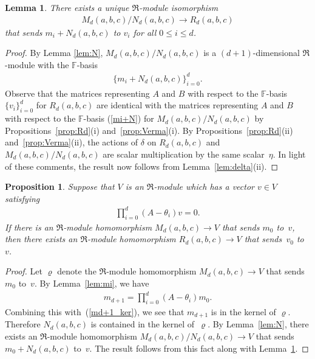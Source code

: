 \documentclass[11pt]{article}
\numberwithin{equation}{section}
\def\F{\mathbb F}
\numberwithin{equation}{section}
\newtheorem{Lemma}[Theorem]{Lemma}
\newtheorem{Proposition}[Theorem]{Proposition}
 { \theoremstyle{definition}
\newtheorem{Definition}[Theorem]{Definition}
\newtheorem{Example}[Theorem]{Example} }
\begin{document}
\begin{Lemma}\label{lem:M/N}There exists a unique $\Re$-module isomorphism
\begin{gather*}
M_d(a,b,c)/N_d(a,b,c)\to R_d(a,b,c)
\end{gather*}
that sends $m_i+N_d(a,b,c)$ to $v_i$ for all $0\leq i\leq d$.
\end{Lemma}
\begin{proof}By Lemma \ref{lem:N}, $M_d(a,b,c)/N_d(a,b,c)$ is a $(d+1)$-dimensional $\Re$-module with the $\F$-basis
\begin{gather}\label{mi+N}
\{m_i+N_d(a,b,c)\}_{i=0}^d.
\end{gather}
Observe that the matrices representing $A$ and $B$ with respect to the $\F$-basis $\{v_i\}_{i=0}^d$ for $R_d(a,b,c)$ are identical with the matrices representing $A$ and $B$ with respect to the $\F$-basis (\ref{mi+N}) for $M_d(a,b,c)/N_d(a,b,c)$ by Propositions~\ref{prop:Rd}(i) and~\ref{prop:Verma}(i). By Propositions~\ref{prop:Rd}(ii) and~\ref{prop:Verma}(ii), the actions of $\delta$ on $R_d(a,b,c)$ and $M_d(a,b,c)/N_d(a,b,c)$ are scalar multiplication by the same scalar~$\eta$. In light of these comments, the result now follows from Lemma~\ref{lem:delta}(ii).
\end{proof}

\begin{Proposition}\label{prop:R}Suppose that $V$ is an $\Re$-module which has a vector $v\in V$ satisfying
\begin{gather}\label{md+1_ker}
\prod_{i=0}^d (A-\theta_i) v=0.
\end{gather}
If there is an $\Re$-module homomorphism $M_d(a,b,c)\to V$ that sends $m_0$ to~$v$, then there exists an $\Re$-module homomorphism $R_d(a,b,c)\to V$ that sends~$v_0$ to~$v$.
\end{Proposition}
\begin{proof}Let $\varrho$ denote the $\Re$-module homomorphism $M_d(a,b,c)\to V$ that sends~$m_0$ to~$v$. By Lemma~\ref{lem:mi}, we have
\begin{gather*}
m_{d+1}=\prod_{i=0}^d (A-\theta_i) m_0.
\end{gather*}
Combining this with~(\ref{md+1_ker}), we see that $m_{d+1}$ is in the kernel of $\varrho$. Therefore $N_d(a,b,c)$ is contained in the kernel of~$\varrho$. By Lemma~\ref{lem:N}, there exists an $\Re$-module homomorphism $M_d(a,b,c)/N_d(a,b,c)\to V$ that sends $m_0+N_d(a,b,c)$ to~$v$. The result follows from this fact along with Lemma~\ref{lem:M/N}.
\end{proof}
\end{document}
